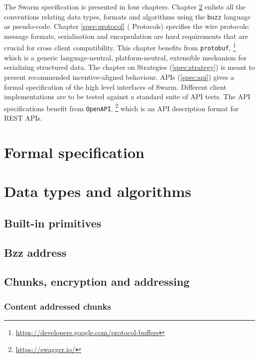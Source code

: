 
The Swarm specification is presented in four chapters. Chapter \ref{spec:convention} enlists all the conventions relating data types, formats and algorithms using the \lstinline{buzz} language as pseudo-code.
Chapter \ref{spec:protocol} ( Protocols) specifies the wire protocols: message formats, serialisation and encapsulation are hard requirements that are crucial for  cross client compatibility. This chapter benefits from \lstinline{protobuf},%
%
\footnote{\url{https://developers.google.com/protocol-buffers}}
%
which is a generic language-neutral, platform-neutral, extensible mechanism for serializing structured data.
The chapter on Strategies (\ref{spec:strategy}) is meant to present recommended incentive-aligned behaviour.
APIs (\ref{spec:api}) gives a formal specification of the high level interfaces of Swarm. Different client implementations are  to be tested against a standard suite of API tests. The API specifications benefit from \lstinline{OpenAPI},%
%
\footnote{\url{https://swagger.io/}}
%
which is an API description format for REST APIs.

\chapter{Formal specification}\label{sec:formal}
\yellow{}


\chapter{Data types and algorithms}\label{spec:convention}

\orange{}

\section{Built-in primitives \statusyellow}\label{spec:format:builtin}


\section{Bzz address\statusgreen}\label{spec:format:bzzaddress}


\section{Chunks, encryption and addressing\statusyellow}
\subsection{Content addressed chunks \statusgreen}\label{spec:format:chunks}

